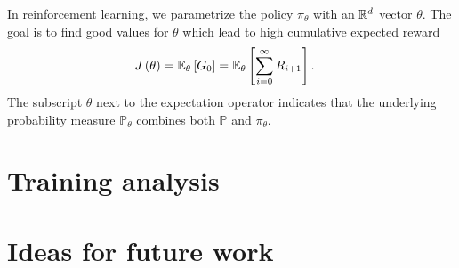 \documentclass[a4paper,12pt]{amsart}
\newcommand{\policy}{\pi}
\newcommand{\prob}{\mathbb P}
\begin{document}
In reinforcement learning, we parametrize the policy $\policy_\theta$ with
an $\mathbb{R}^{d}$ vector $\theta$. The goal is to find good values for $\theta$ 
which lead to high cumulative expected reward
\begin{align*}
    J\left( \theta \right) &= \mathbb{E}_{\theta} \left[ G_0 \right] 
    = \mathbb{E}_{\theta} \left[ \sum_{i=0}^{\infty} R_{i+1} \right].
\end{align*}
The subscript $\theta$ next to the expectation operator indicates that
the underlying probability measure $\prob_{\theta}$ combines both
$\prob$ and $\policy_{\theta}$.


\section{Training analysis}

\section{Ideas for future work}

\printbibliography
\end{document}
